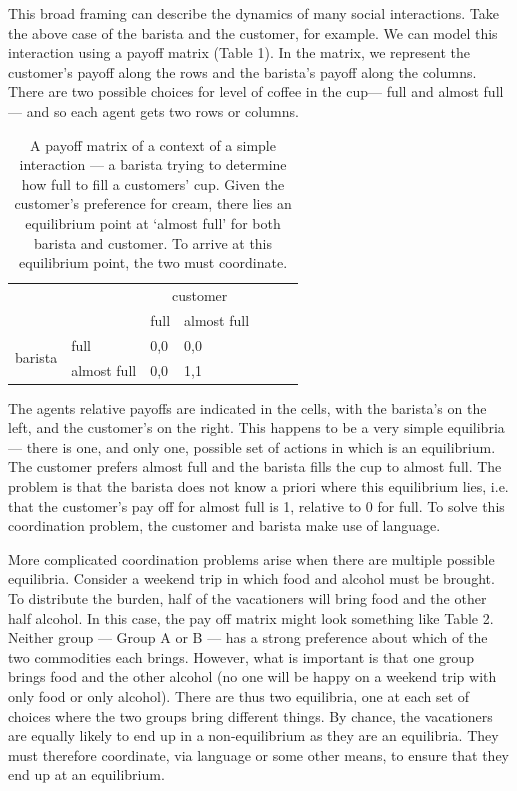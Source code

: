 \documentclass[man, noapacite, 12pt]{apa2}
\begin{document}
This broad framing can describe the dynamics of many social interactions. Take the above case of the barista and the customer, for example. We can model this interaction using a payoff matrix (Table 1). In the matrix, we represent the customer's payoff along the rows and the barista's payoff along the columns. There are two possible choices for  level of coffee in the cup---  full and  almost full --- and so each agent gets two rows or columns. 
\begin{table}[t]
\begin{center}
\begin{tabular}{l p{3cm} l p{3cm} l p{3cm} r}
 &  & \multicolumn{2}{c}{customer} \\ \cline{2-4} 
\multicolumn{1}{l|}{} & \multicolumn{1}{l|}{} & \multicolumn{1}{l|}{full} & \multicolumn{1}{l|}{almost full} \\ \cline{2-4} 
\multicolumn{1}{c|}{\multirow{2}{*}{barista}} & \multicolumn{1}{l|}{full} & \multicolumn{1}{l|}{0,0} & \multicolumn{1}{l|}{0,0} \\ \cline{2-4} 
\multicolumn{1}{c|}{} & \multicolumn{1}{l|}{almost full} & \multicolumn{1}{l|}{0,0} & \multicolumn{1}{l|}{1,1} \\ \cline{2-4} 
\end{tabular}
\caption{A payoff matrix of a context of a simple interaction --- a barista trying to determine how full to fill a customers' cup. Given the customer's preference for cream, there lies an equilibrium point at `almost full' for both barista and customer. To arrive at this equilibrium point, the two must coordinate.}
\end{center}
\end{table}
The agents relative payoffs are indicated in the cells, with the barista's on the left, and the customer's on the right. This happens to be a very simple equilibria --- there is one, and only one, possible set of actions in which is an equilibrium. The customer prefers almost full and the barista fills the cup to almost full. The problem is that the barista does not know a priori where this equilibrium lies, i.e. that the customer's pay off for almost full is 1, relative to 0 for full. To solve this coordination problem, the customer and barista make use of language.

More complicated coordination problems arise when there are multiple possible equilibria. Consider a weekend trip in which food and alcohol must be brought. To distribute the burden, half of the vacationers will bring food and the other half alcohol. In this case, the pay off matrix might look something like Table 2. Neither group --- Group A or B --- has a strong preference about which of the two commodities each brings. However, what is important is that one group brings food and the other alcohol (no one will be happy on a weekend trip with only food or only alcohol). There are thus two equilibria, one  at each set of choices where the two groups bring different things. By chance, the vacationers are equally likely to end up in a non-equilibrium as they are an equilibria. They must  therefore coordinate, via language or some other means, to ensure that they end up at an equilibrium.
\end{document}
